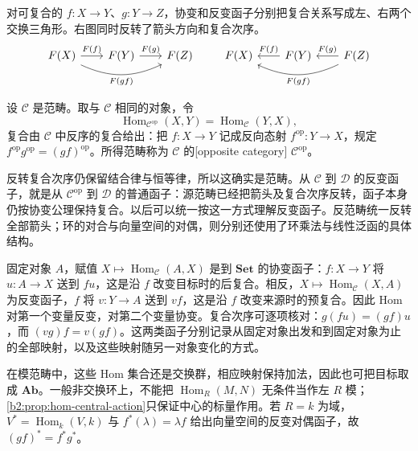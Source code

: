 对可复合的 \(f:X\to Y\)、\(g:Y\to Z\)，协变和反变函子分别把复合关系写成左、右两个交换三角形。右图同时反转了箭头方向和复合次序。
\[
	\begin{tikzcd}[column sep=2em]
		F(X)\arrow[r,"F(f)"]\arrow[rr,bend right=25,"F(gf)"']&F(Y)\arrow[r,"F(g)"]&F(Z)
	\end{tikzcd}
	\qquad
	\begin{tikzcd}[column sep=2em]
		F(X)&F(Y)\arrow[l,"F(f)"']&F(Z)\arrow[l,"F(g)"']\arrow[ll,bend left=25,"F(gf)"]
	\end{tikzcd}
\]

\begin{definition}\label{b2:def:opposite-category}
	设 \(\mathcal C\) 是范畴。取与 \(\mathcal C\) 相同的对象，令
	\[
		\operatorname{Hom}_{\mathcal C^{\mathrm{op}}}(X,Y)=\operatorname{Hom}_{\mathcal C}(Y,X),
	\]
	复合由 \(\mathcal C\) 中反序的复合给出：把 \(f:X\rightarrow Y\) 记成反向态射 \(f^{\mathrm{op}}:Y\rightarrow X\)，规定 \(f^{\mathrm{op}}g^{\mathrm{op}}=(gf)^{\mathrm{op}}\)。所得范畴称为 \(\mathcal C\) 的[opposite category] \(\mathcal C^{\mathrm{op}}\)。
\end{definition}

反转复合次序仍保留结合律与恒等律，所以这确实是范畴。从 \(\mathcal C\) 到 \(\mathcal D\) 的反变函子，就是从 \(\mathcal C^{\mathrm{op}}\) 到 \(\mathcal D\) 的普通函子：源范畴已经把箭头及复合次序反转，函子本身仍按协变公理保持复合。以后可以统一按这一方式理解反变函子。反范畴统一反转全部箭头；环的对合与向量空间的对偶，则分别还使用了环乘法与线性泛函的具体结构。

\ProseParagraphBreak
固定对象 \(A\)，赋值 \(X\mapsto\operatorname{Hom}_{\mathcal C}(A,X)\) 是到 \(\mathbf{Set}\) 的协变函子：\(f:X\rightarrow Y\) 将 \(u:A\rightarrow X\) 送到 \(fu\)，这是沿 \(f\) 改变目标时的后复合。相反，\(X\mapsto\operatorname{Hom}_{\mathcal C}(X,A)\) 为反变函子，\(f\) 将 \(v:Y\rightarrow A\) 送到 \(vf\)，这是沿 \(f\) 改变来源时的预复合。因此 Hom 对第一个变量反变，对第二个变量协变。复合次序可逐项核对：\(g(fu)=(gf)u\)，而 \((vg)f=v(gf)\)。这两类函子分别记录从固定对象出发和到固定对象为止的全部映射，以及这些映射随另一对象变化的方式。

\ProseParagraphBreak
在模范畴中，这些 Hom 集合还是交换群，相应映射保持加法，因此也可把目标取成 \(\mathbf{Ab}\)。一般非交换环上，不能把 \(\operatorname{Hom}_R(M,N)\) 无条件当作左 \(R\) 模；\cref{b2:prop:hom-central-action}只保证中心的标量作用。若 \(R=k\) 为域，\(V^*=\operatorname{Hom}_k(V,k)\) 与 \(f^*(\lambda)=\lambda f\) 给出向量空间的反变对偶函子，故 \((gf)^*=f^*g^*\)。

